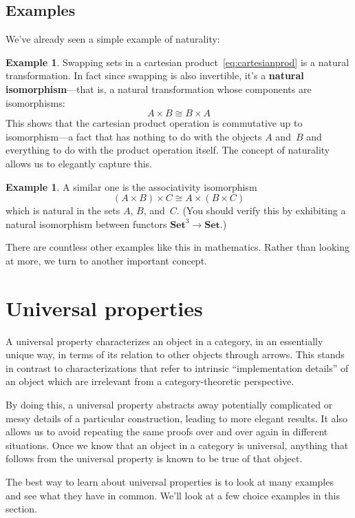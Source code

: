 \documentclass[letterpaper,12pt]{article}
\newcommand{\iso}{\cong}
\newcommand{\cat}[1]{\mathbf{#1}}
\newcommand{\Set}{\cat{Set}}
\newcommand{\textdefn}{\textbf}
\theoremstyle{definition}
\newtheorem{exmp}[equation]{Example}
\theoremstyle{plain}
\numberwithin{equation}{section}
\begin{document}
\subsection{Examples}
We've already seen a simple example of naturality:
\begin{exmp}
Swapping sets in a cartesian product~\eqref{eq:cartesianprod} is a natural transformation. In fact since swapping is also invertible, it's a \textdefn{natural isomorphism}---that is, a natural transformation whose components are isomorphisms:
\[A\times B\iso B\times A\]
This shows that the cartesian product operation is commutative up to isomorphism---a fact that has nothing to do with the objects \(A\) and~\(B\) and everything to do with the product operation itself. The concept of naturality allows us to elegantly capture this.
\end{exmp}

\begin{exmp}
A similar one is the associativity isomorphism
\[(A\times B)\times C\iso A\times(B\times C)\]
which is natural in the sets \(A\), \(B\), and~\(C\). (You should verify this by exhibiting a natural isomorphism between functors \(\Set^3\to\Set\).)
\end{exmp}

\noindent There are countless other examples like this in mathematics. Rather than looking at more, we turn to another important concept.

\section{Universal properties}
A universal property characterizes an object in a category, in an essentially unique way, in terms of its relation to other objects through arrows. This stands in contrast to characterizations that refer to intrinsic ``implementation details'' of an object which are irrelevant from a category-theoretic perspective.

By doing this, a universal property abstracts away potentially complicated or messy details of a particular construction, leading to more elegant results. It also allows us to avoid repeating the same proofs over and over again in different situations. Once we know that an object in a category is universal, anything that follows from the universal property is known to be true of that object.

The best way to learn about universal properties is to look at many examples and see what they have in common. We'll look at a few choice examples in this section.
\end{document}
